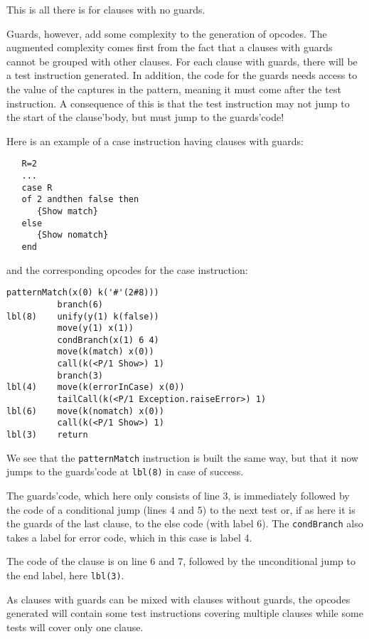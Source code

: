 \documentclass[a4paper]{memoir}
\begin{document}
This is all there is for clauses with no guards. 

Guards, however, add some complexity to the generation of opcodes.
The augmented complexity comes first from the fact that a clauses with guards cannot
be grouped with other clauses. For each clause with guards, there will be a
test instruction generated. In addition, the code for the guards needs access
to the value of the captures in the pattern, meaning it must come after the
test instruction. A consequence of this is that the test instruction may not jump to the start
of the clause'body, but must jump to the guards'code!

Here is an example of a case instruction having clauses with guards:
\begin{lstlisting}
   R=2
   ...
   case R
   of 2 andthen false then
      {Show match}
   else
      {Show nomatch}
   end
\end{lstlisting}

and the corresponding opcodes for the case instruction:

\lstset{numbers=left, numberstyle=\tiny, stepnumber=1, numbersep=5pt}
\begin{lstlisting}[firstnumber=1]
          patternMatch(x(0) k('#'(2#8)))
          branch(6)
lbl(8)    unify(y(1) k(false))
          move(y(1) x(1))
          condBranch(x(1) 6 4)
          move(k(match) x(0))
          call(k(<P/1 Show>) 1)
          branch(3)
lbl(4)    move(k(errorInCase) x(0))
          tailCall(k(<P/1 Exception.raiseError>) 1)
lbl(6)    move(k(nomatch) x(0))
          call(k(<P/1 Show>) 1)
lbl(3)    return
\end{lstlisting}
\lstset{numbers=none}
We see that the \lstinline!patternMatch! instruction is built the same way, but
that it now jumps to the guards'code at \lstinline!lbl(8)! in case of
success. 

The guards'code, which here only consists of line 3, is immediately
followed by the code of a conditional jump (lines 4 and 5) to the next test or, if as here it is the guards
of the last clause, to the else code (with label 6). The \lstinline!condBranch!
also takes a label for error code, which in this case is label 4.

The code of the clause is on line 6 and 7, followed by the unconditional jump to
the end label, here \lstinline!lbl(3)!.

As clauses with guards can be mixed with clauses without guards, the opcodes
generated will contain some test instructions covering multiple clauses while
some tests will cover only one clause.
\end{document}
